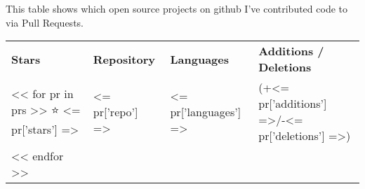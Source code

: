 \documentclass[../cv.tex]{subfiles}
\begin{document}
This table shows which open source projects on github I've contributed code to via Pull Requests.

\begin{tabular}{llll}
\textbf{Stars} & \textbf{Repository} & \textbf{Languages} & \textbf{Additions / Deletions} \\
<< for pr in prs >>
⭐ <= pr['stars'] => & <= pr['repo'] => & <= pr['languages'] => & (+<= pr['additions'] =>/-<= pr['deletions'] =>)\\
<< endfor >>
\end{tabular}
\end{document}
